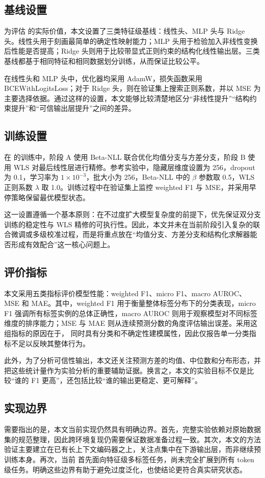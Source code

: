 \subsection{基线设置}
为评估 \method{} 的实际价值，本文设置了三类特征级基线：线性头、MLP 头与 Ridge 头。线性头用于刻画最简单的确定性映射能力；MLP 头用于检验加入非线性变换后性能是否提高；Ridge 头则用于比较带显式正则约束的结构化线性输出层。三类基线都基于相同特征和相同数据划分训练，从而保证比较公平。

在线性头和 MLP 头中，优化器均采用 AdamW，损失函数采用 BCEWithLogitsLoss；对于 Ridge 头，则在验证集上搜索正则系数，并以 MSE 为主要选择依据。通过这样的设置，本文能够比较清楚地区分“非线性提升”“结构约束提升”和“可信输出层提升”之间的差异。

\subsection{\method{} 训练设置}
在 \method{} 的训练中，阶段 A 使用 Beta-NLL 联合优化均值分支与方差分支，阶段 B 使用 WLS 对最后线性层进行精修。参考实验中，隐藏层维度设置为 256，dropout 为 0.1，学习率为 $1\times10^{-3}$，批大小为 256，Beta-NLL 中的 $\beta$ 参数取 0.5，WLS 正则系数 $\lambda$ 取 1.0。训练过程中在验证集上监控 weighted F1 与 MSE，并采用早停策略保留最优模型状态。

这一设置遵循一个基本原则：在不过度扩大模型复杂度的前提下，优先保证双分支训练的稳定性与 WLS 精修的可执行性。因此，本文并未在当前阶段引入复杂的联合微调或多级校准过程，而是将重点放在“均值分支、方差分支和结构化求解器能否形成有效配合”这一核心问题上。

\subsection{评价指标}
本文采用五类指标评价模型性能：weighted F1、micro F1、macro AUROC、MSE 和 MAE。其中，weighted F1 用于衡量整体标签分布下的分类表现，micro F1 强调所有标签实例的总体正确性，macro AUROC 则用于观察模型对不同标签维度的排序能力；MSE 与 MAE 则从连续预测分数的角度评估输出误差。采用这组指标的原因在于，\method{} 同时具有分类和不确定性建模属性，因此仅报告单一分类指标不足以反映其整体行为。

此外，为了分析可信性输出，本文还关注预测方差的均值、中位数和分布形态，并把这些统计量作为实验分析的重要辅助证据。换言之，本文的实验目标不仅是比较“谁的 F1 更高”，还包括比较“谁的输出更稳定、更可解释”。

\subsection{实现边界}
需要指出的是，本文当前实现仍然具有明确边界。首先，完整实验依赖对原始数据集的规范整理，因此跨环境复现仍需要保证数据准备过程一致。其次，本文的方法验证主要建立在已有长上下文编码器之上，关注点集中在下游输出层，而非继续预训练本身。再次，当前 \method{} 首先面向特征级多标签任务，尚未完全扩展到所有 token 级任务。明确这些边界有助于避免过度泛化，也使结论更符合真实研究状态。
